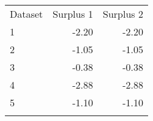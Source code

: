 \begin{tabular}{lrr}
\hline \noalign{\smallskip}Dataset & Surplus 1 & Surplus 2\\
\noalign{\smallskip}\hline \noalign{\smallskip}1 & -2.20 & -2.20\\
2 & -1.05 & -1.05\\
3 & -0.38 & -0.38\\
4 & -2.88 & -2.88\\
5 & -1.10 & -1.10\\
\noalign{\smallskip}\hline\end{tabular}\\
